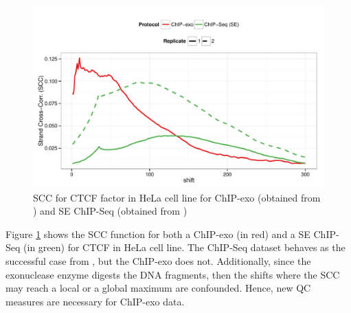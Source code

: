 \documentclass[11pt]{article}\usepackage[]{graphicx}\usepackage[]{color}
\begin{document}
\begin{figure}[H]
  \centering  
\includegraphics[width = .7\textwidth]{../figs/for_paper/scc_ctcf.pdf}
  \caption{SCC for CTCF factor in HeLa cell line for ChIP-exo (obtained from \cite{exo1}) and SE ChIP-Seq (obtained from \cite{encode1}) }
  \label{fig:scc}
\end{figure}

Figure \ref{fig:scc} shows the SCC function for both a ChIP-exo (in
red) and a SE ChIP-Seq (in green) for CTCF in HeLa cell line. The
ChIP-Seq dataset behaves as the successful case from \cite{encode_qc},
but the ChIP-exo does not. Additionally, since the exonuclease enzyme
digests the DNA fragments, then the shifts where the SCC may reach a
local or a global maximum are confounded. Hence, new QC measures are
necessary for ChIP-exo data.
\end{document}
